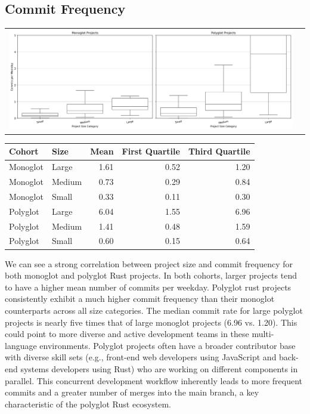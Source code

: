 \documentclass[11pt]{article}
\begin{document}
\subsection{Commit Frequency}
\begin{tabularx}{\linewidth}{@{}XX@{}}
\includegraphics[width=\linewidth]{figures/commit_freq.jpg}
\end{tabularx}
\begin{center}
\begin{tabular}{llrrr}
Cohort & Size & Mean & First Quartile & Third Quartile\\
\hline
Monoglot & Large & 1.61 & 0.52 & 1.20\\
Monoglot & Medium & 0.73 & 0.29 & 0.84\\
Monoglot & Small & 0.33 & 0.11 & 0.30\\
Polyglot & Large & 6.04 & 1.55 & 6.96\\
Polyglot & Medium & 1.41 & 0.48 & 1.59\\
Polyglot & Small & 0.60 & 0.15 & 0.64\\
\end{tabular}
\end{center}
We can see a strong correlation between project size and commit frequency for both monoglot and polyglot Rust projects. In both cohorts, larger projects tend to have a higher mean number of commits per weekday. Polyglot rust projects consistently exhibit a much higher commit frequency than their monoglot counterparts across all size categories. The median commit rate for large polyglot projects is nearly five times that of large monoglot projects (6.96 vs. 1.20). This could point to more diverse and active development teams in these multi-language environments. Polyglot projects often have a broader contributor base with diverse skill sets (e.g., front-end web developers using JavaScript and back-end systems developers using Rust) who are working on different components in parallel. This concurrent development workflow inherently leads to more frequent commits and a greater number of merges into the main branch, a key characteristic of the polyglot Rust ecosystem.
\end{document}
